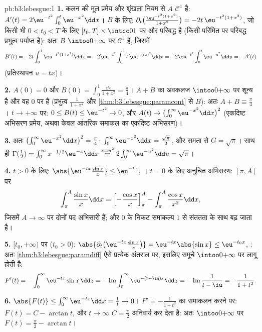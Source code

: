 \begin{solution}{pb:b3:lebesgue:1}
\textbf{1.} कलन की मूल प्रमेय और शृंखला नियम से $A$ $\mathcal C^1$ है:
$A'(t) =
2\eu^{-t^2}\int_0^t\eu^{-x^2}\dd x$। $B$ के लिए: $\partial_t\bigl(\frac{\eu^{-t^2(1+x^2)}}{1+x^2}\bigr) =
-2t\,\eu^{-t^2(1+x^2)}$, जो किसी भी $0 < t_0 < T$ के लिए $[t_0, T]
\times \intcc01$ पर 
और परिबद्ध है (किसी परिमित  पर परिबद्ध प्रभुत्व पर्याप्त
है): अतः $B$ $\intoo0{+\infty}$ पर $\mathcal C^1$ है, जिसमें
\[
B'(t) = -2t\int_0^1 \eu^{-t^2(1+x^2)}\dd x
= -2\eu^{-t^2}\int_0^1 t\,\eu^{-(tx)^2}\dd x
= -2\eu^{-t^2}\int_0^t\eu^{-u^2}\dd u = -A'(t)
\]
(प्रतिस्थापन $u = tx$)।

\textbf{2.} $A(0) = 0$ और $B(0) = \int_0^1\frac{\dd x}{1+x^2}
= \frac\pi4$। $A + B$ का अवकलज $\intoo0{+\infty}$ पर शून्य है और वह
$0$ पर  है (प्रभुत्व $\frac1{1+x^2}$ और \cref{thm:b3:lebesgue:paramcont} से $B$): अतः $A + B \equiv \frac\pi4$।
$t\to+\infty$ पर: $0 \leq B(t) \leq \eu^{-t^2} \to 0$, और $A(t) \to \bigl(\int_0^\infty\eu^{-x^2}\dd x\bigr)^2$ (एकदिष्ट अभिसरण प्रमेय, अथवा केवल आंतरिक
समाकल का एकदिष्ट अभिसरण)।

\textbf{3.} अतः $\bigl(\int_0^\infty\eu^{-x^2}\dd x\bigr)^2
= \frac\pi4$: $\int_0^\infty\eu^{-x^2}\dd x =
\frac{\sqrt\pi}2$, और समता से $G = \sqrt\pi$। साथ ही $\Gamma(\frac12) = \int_0^\infty x^{-1/2}\eu^{-x}\dd x
\overset{x = u^2}{=} 2\int_0^\infty\eu^{-u^2}\dd u =
\sqrt\pi$।

\textbf{4.} $t > 0$ के लिए: $\abs{\eu^{-tx}\frac{\sin x}x} \leq
\eu^{-tx}$, । $t = 0$ के लिए अनुचित
अभिसरण: $[\pi, A]$ पर
\[
\int_\pi^A\frac{\sin x}x\dd x
= \Bigl[-\frac{\cos x}x\Bigr]_\pi^A -
\int_\pi^A\frac{\cos x}{x^2}\dd x,
\]
जिसमें $A \to \infty$ पर दोनों पद अभिसारी हैं; और $0$ के निकट समाकल्य $1$
से संततता के साथ बढ़ जाता है।

\textbf{5.} $[t_0, +\infty)$ पर ($t_0 > 0$): $\abs{\partial_t\bigl(\eu^{-tx}\tfrac{\sin x}x\bigr)} =
\eu^{-tx}\abs{\sin x} \leq \eu^{-t_0x}$, : अतः \cref{thm:b3:lebesgue:paramdiff} ऐसे प्रत्येक
अंतराल पर, इसलिए समूचे $\intoo0{+\infty}$ पर लागू होती है:
\[
F'(t) = -\int_0^\infty\eu^{-tx}\sin x\,\dd x
= -\operatorname{Im}\int_0^\infty\eu^{-(t - \iu)x}\dd x
= -\operatorname{Im}\frac{1}{t - \iu} = -\frac{1}{1 + t^2}.
\]

\textbf{6.} $\abs{F(t)} \leq \int_0^\infty\eu^{-tx}\dd x =
\frac1t \to 0$। $F' = -\frac1{1+t^2}$ का समाकलन करने पर: $F(t) = C -
\arctan t$, और $t \to \infty$ $C = \frac\pi2$
अनिवार्य कर देता है: अतः $\intoo0{+\infty}$ पर $F(t) =
\frac\pi2 - \arctan t$।


\end{solution}
